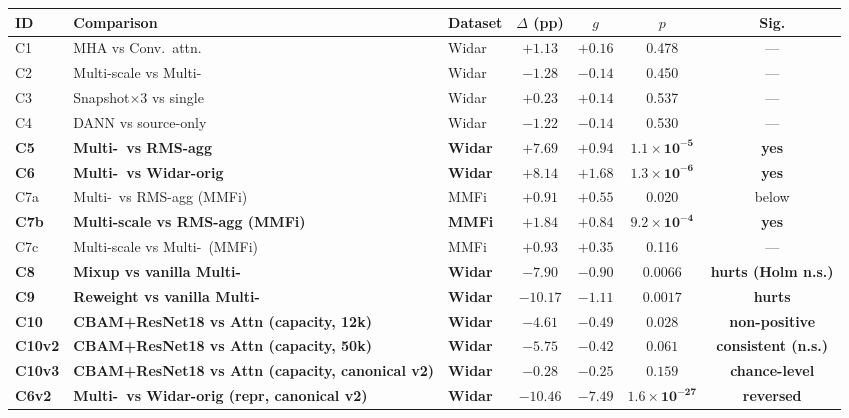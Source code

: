 \documentclass[journal,11pt]{IEEEtran}
\newcommand{\MDE}{\text{MDE}}
\newcommand{\Rx}{\text{Rx}}
\begin{document}
\begin{table}[!t]
\begin{tabular}{@{}l >{\raggedright\arraybackslash}p{5cm} l c c c c@{}}
    \toprule
    ID & Comparison & Dataset & $\Delta$ (pp) & $g$ & $p$ & Sig. \\
    \midrule
    C1 & MHA vs Conv.\ attn.               & Widar & $+1.13$   & $+0.16$ & 0.478 & ---  \\
    C2 & Multi-scale vs Multi-\Rx          & Widar & $-1.28$   & $-0.14$ & 0.450 & ---  \\
    C3 & Snapshot$\times$3 vs single       & Widar & $+0.23$   & $+0.14$ & 0.537 & ---  \\
    C4 & DANN vs source-only               & Widar & $-1.22$   & $-0.14$ & 0.530 & ---  \\
    \textbf{C5} & \textbf{Multi-\Rx\ vs RMS-agg} & \textbf{Widar} & $\mathbf{+7.69}$ & $\mathbf{+0.94}$ & $\mathbf{1.1\!\times\!10^{-5}}$ & \textbf{yes} \\
    \textbf{C6} & \textbf{Multi-\Rx\ vs Widar-orig} & \textbf{Widar} & $\mathbf{+8.14}$ & $\mathbf{+1.68}$ & $\mathbf{1.3\!\times\!10^{-6}}$ & \textbf{yes} \\
    C7a & Multi-\Rx\ vs RMS-agg (MMFi)     & MMFi & $+0.91$   & $+0.55$ & 0.020 & below \MDE \\
    \textbf{C7b} & \textbf{Multi-scale vs RMS-agg (MMFi)} & \textbf{MMFi} & $\mathbf{+1.84}$ & $\mathbf{+0.84}$ & $\mathbf{9.2\!\times\!10^{-4}}$ & \textbf{yes} \\
    C7c & Multi-scale vs Multi-\Rx\ (MMFi)     & MMFi & $+0.93$   & $+0.35$ & 0.116 & --- \\
    \textbf{C8} & \textbf{Mixup vs vanilla Multi-\Rx} & \textbf{Widar} & $\mathbf{-7.90}$ & $\mathbf{-0.90}$ & $\mathbf{0.0066}$ & \textbf{hurts (Holm n.s.)} \\
    \textbf{C9} & \textbf{Reweight vs vanilla Multi-\Rx} & \textbf{Widar} & $\mathbf{-10.17}$ & $\mathbf{-1.11}$ & $\mathbf{0.0017}$ & \textbf{hurts} \\
    \textbf{C10} & \textbf{CBAM+ResNet18 vs Attn (capacity, 12k)} & \textbf{Widar} & $\mathbf{-4.61}$ & $\mathbf{-0.49}$ & $\mathbf{0.028}$ & \textbf{non-positive} \\
    \textbf{C10v2} & \textbf{CBAM+ResNet18 vs Attn (capacity, 50k)} & \textbf{Widar} & $\mathbf{-5.75}$ & $\mathbf{-0.42}$ & $\mathbf{0.061}$ & \textbf{consistent (n.s.)} \\
    \textbf{C10v3} & \textbf{CBAM+ResNet18 vs Attn (capacity, canonical v2)} & \textbf{Widar} & $\mathbf{-0.28}$ & $\mathbf{-0.25}$ & $\mathbf{0.159}$ & \textbf{chance-level} \\
    \textbf{C6v2} & \textbf{Multi-\Rx\ vs Widar-orig (repr, canonical v2)} & \textbf{Widar} & $\mathbf{-10.46}$ & $\mathbf{-7.49}$ & $\mathbf{1.6\!\times\!10^{-27}}$ & \textbf{reversed} \\
    \bottomrule
    \end{tabular}
\end{table}
\end{document}
